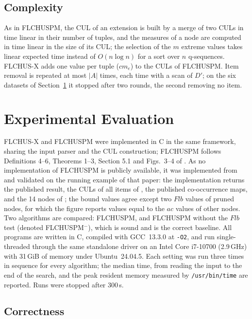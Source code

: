 \documentclass[runningheads]{llncs}
\newcommand{\FL}{\textsc{FLCHUSPM}}
\newcommand{\FX}{\textsc{FLCHUS-X}}
\newcommand{\flb}{\ensuremath{\mathit{Flb}}}
\newcommand{\ac}{\ensuremath{\mathit{ac}}}
\begin{document}
\subsection{Complexity}

As in \FL{}, the CUL of an extension is built by a merge of two CULs in time linear in their
number of tuples, and the measures of a node are computed in time linear in the size of its
CUL; the selection of the $m$ extreme values takes linear expected time instead of
$O(n \log n)$ for a sort over $n$ q-sequences. \FX{} adds one value per tuple
($\mathit{cm}_e$) to the CULs of \FL{}. Item removal is repeated at most $|A|$ times, each time with a scan of
$D'$; on the six datasets of Section~\ref{sec:exp} it stopped after two rounds, the second
removing no item.

\section{Experimental Evaluation}\label{sec:exp}

\FX{} and \FL{} were implemented in C in the same framework, sharing the input parser and the
CUL construction; \FL{} follows Definitions 4--6, Theorems 1--3, Section 5.1 and Figs.~3--4 of
\cite{truong2022}. As no implementation of \FL{} is publicly available, it was implemented from
\cite{truong2022} and validated on the running example of that paper: the implementation returns
the published result, the CULs of all items of \cite[Fig.~1]{truong2022}, the published
co-occurrence maps, and the 14 nodes of \cite[Fig.~5]{truong2022}; the bound values agree
except two \flb{} values of pruned nodes, for which the figure reports values equal to the \ac{}
values of other nodes. Two algorithms are compared: \FL{}, and \FL{} without the \flb{}
test (denoted \FL$^{-}$), which is sound and is the correct baseline. All programs are written in
C, compiled with GCC~13.3.0 at \texttt{-O2}, and run single-threaded through the same standalone
driver on an Intel Core i7-10700 (2.9\,GHz) with 31\,GiB of memory under Ubuntu~24.04.5. Each
setting was run three times in sequence for every algorithm; the median time, from reading the
input to the end of the search, and the peak resident memory measured by \texttt{/usr/bin/time}
are reported. Runs were stopped after 300\,s.

\subsection{Correctness}
\end{document}

